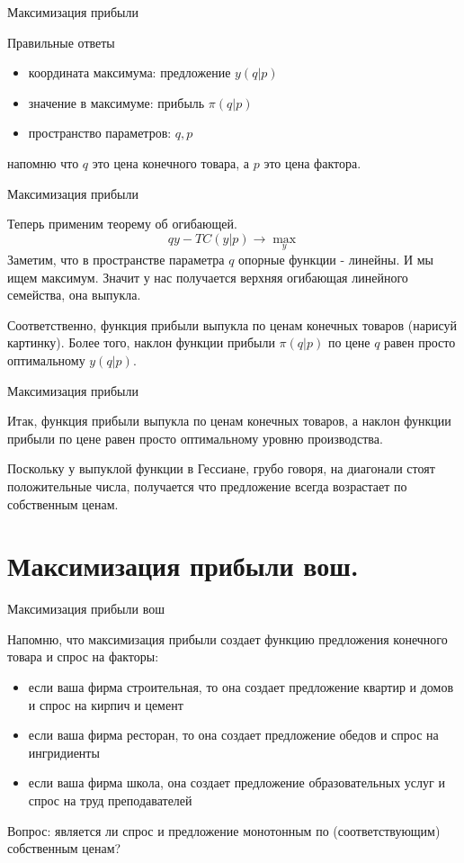 \documentclass{beamer}
\begin{document}
\begin{frame}{Максимизация прибыли}

Правильные ответы

\begin{itemize}
  \item координата максимума: предложение $y (q| p)$
  \item значение в максимуме: прибыль $\pi(q| p)$
  \item пространство параметров: $q, p$
\end{itemize}

напомню что $q$ это цена конечного товара, а $p$ это цена фактора.

\end{frame}

\begin{frame}{Максимизация прибыли}

Теперь применим теорему об огибающей.
$$ q y - TC(y| p) \to \max_y$$
Заметим, что в пространстве параметра $q$ опорные функции - линейны. И мы ищем максимум. Значит у нас получается верхняя огибающая линейного семейства, она выпукла. 

Соответственно, функция прибыли выпукла по ценам конечных товаров (нарисуй картинку). Более того, наклон функции прибыли $\pi(q|p)$ по цене $q$ равен просто оптимальному $y(q|p)$.
\end{frame}

\begin{frame}{Максимизация прибыли}

Итак, функция прибыли выпукла по ценам конечных товаров, а наклон функции прибыли по цене равен просто оптимальному уровню производства.

Поскольку у выпуклой функции в Гессиане, грубо говоря, на диагонали стоят положительные числа, получается что \alert{предложение всегда возрастает по собственным ценам}.

\end{frame}

\section{Максимизация прибыли вош.}

\begin{frame}{Максимизация прибыли вош}

Напомню, что максимизация прибыли создает функцию предложения конечного товара и спрос на факторы:

\begin{itemize}
  \item если ваша фирма строительная, то она создает предложение квартир и домов и спрос на кирпич и цемент
  \item если ваша фирма ресторан, то она создает предложение обедов и спрос на ингридиенты
  \item если ваша фирма школа, она создает предложение образовательных услуг и спрос на труд преподавателей
\end{itemize}

Вопрос: является ли спрос и предложение монотонным по (соответствующим) собственным ценам?
\end{frame}
\end{document}
